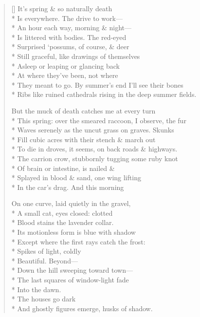 \label{ch:naturally_death}
\settowidth{\versewidth}{Ribs like ruined cathedrals rising in the deep summer fields.}
\begin{verse}[\versewidth]
It's spring \& so naturally death\\*
Is everywhere. The drive to work---\\*
An hour each way, morning \& night---\\*
Is littered with bodies. The red-eyed\\*
Surprised `possums, of course, \& deer\\*
Still graceful, like drawings of themselves\\*
Asleep or leaping or glancing back\\*
At where they've been, not where\\*
They meant to go. By summer's end I'll see their bones\\*
Ribs like ruined cathedrals rising in the deep summer fields.

But the muck of death catches me at every turn \\*
This spring: over the smeared raccoon, I observe, the fur\\*
Waves serenely as the uncut grass on graves. Skunks\\*
Fill cubic acres with their stench \& march out\\*
To die in droves, it seems, on back roads \& highways.\\*
The carrion crow, stubbornly tugging some ruby knot\\*
Of brain or intestine, is nailed \&\\*
Splayed in blood \& sand, one wing lifting\\*
In the car's drag. And this morning

On one curve, laid quietly in the gravel,\\*
A small cat, eyes closed: clotted \\*
Blood stains the lavender collar.\\*
Its motionless form is blue with shadow\\*
Except where the first rays catch the frost:\\*
Spikes of light, coldly\\*
Beautiful.  Beyond---\\*
Down the hill sweeping toward town---\\*
The last squares of window-light fade\\*
Into the dawn.\\*
 The houses go dark\\*
And ghostly figures emerge, husks of shadow.


\end{verse}

